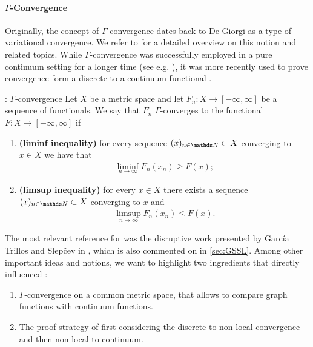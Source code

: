 \paragraph{$\Gamma$-Convergence} Originally, the concept of $\Gamma$-convergence dates back to De Giorgi \cite{de1975tipo} as a type of variational convergence. We refer to \cite{Brad02, dal2012introduction} for a detailed overview on this notion and related topics. While $\Gamma$-convergence was successfully employed in a pure continuum setting for a longer time (see e.g. \cite{modica1977esempio}), it was more recently used to prove convergence form a discrete to a continuum functional \cite{chambolle2010continuous, braides2012quantitative, van2012gamma}. 
%
%
%
\begin{definition}{\cite{de1975tipo}: $\Gamma$-convergence}{}
Let $X$ be a metric space and let $F_n:X\rightarrow [-\infty,\infty]$ be a sequence of 
functionals. We say that $F_n$ $\Gamma$-converges to the functional 
$F:X\rightarrow [-\infty,\infty]$ if
\begin{enumerate}[label=(\roman*)]
	\item \textbf{(liminf inequality)} for every sequence $(x)_{n\in\N}\subset X$ converging to 
	$x\in X$ we have that
	\begin{align*}
		\liminf_{n\rightarrow\infty} F_n(x_n) \geq F(x);
	\end{align*}
	\item\textbf{(limsup inequality)} for every $x\in X$ there exists a sequence 
	$(x)_{n\in\N}\subset X$ converging to $x$ and 
	\begin{align*}
		\limsup_{n\rightarrow\infty} F_n(x_n)\leq F(x).
	\end{align*}
\end{enumerate}
\end{definition}
%
\noindent%
The most relevant reference for \cite{roith2022continuum} was the disruptive work presented by Garc\'ia Trillos and Slep\v{c}ev in \cite{GarcSlep15}, which is also commented on in \cref{sec:GSSL}. Among other important ideas and notions, we want to highlight two ingredients that directly influenced \cite{roith2022continuum}:
%
\begin{enumerate}[label=\arabic*)]
\item $\Gamma$-convergence on a common metric space, that allows to compare graph functions with continuum functions.
\item The proof strategy of first considering the discrete to non-local convergence and then non-local to continuum.
\end{enumerate}
